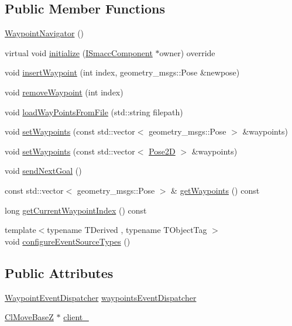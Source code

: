 \subsection*{Public Member Functions}
\begin{DoxyCompactItemize}
\item 
\hyperlink{classsmacc_1_1WaypointNavigator_a8924fe11db589727a91048ffdba2a85f}{Waypoint\+Navigator} ()
\item 
virtual void \hyperlink{classsmacc_1_1WaypointNavigator_a415aca03983319611e6872fb8c6e313f}{initialize} (\hyperlink{classsmacc_1_1ISmaccComponent}{I\+Smacc\+Component} $\ast$owner) override
\item 
void \hyperlink{classsmacc_1_1WaypointNavigator_abdcd86738247eccaf849903881247b0d}{insert\+Waypoint} (int index, geometry\+\_\+msgs\+::\+Pose \&newpose)
\item 
void \hyperlink{classsmacc_1_1WaypointNavigator_a4c290be90b5bfa44687f8beaa867f9b8}{remove\+Waypoint} (int index)
\item 
void \hyperlink{classsmacc_1_1WaypointNavigator_a3324ee12d697827e242b48ab3fd23edb}{load\+Way\+Points\+From\+File} (std\+::string filepath)
\item 
void \hyperlink{classsmacc_1_1WaypointNavigator_a2cb7fb208ade09ed7af4585837d051ee}{set\+Waypoints} (const std\+::vector$<$ geometry\+\_\+msgs\+::\+Pose $>$ \&waypoints)
\item 
void \hyperlink{classsmacc_1_1WaypointNavigator_a035fd5f71532fa87981a477fde5d363c}{set\+Waypoints} (const std\+::vector$<$ \hyperlink{structsmacc_1_1Pose2D}{Pose2D} $>$ \&waypoints)
\item 
void \hyperlink{classsmacc_1_1WaypointNavigator_a127438f90a00e98628ebd64b4c84b0b7}{send\+Next\+Goal} ()
\item 
const std\+::vector$<$ geometry\+\_\+msgs\+::\+Pose $>$ \& \hyperlink{classsmacc_1_1WaypointNavigator_afe1e18903d81f1d3eb20e2689f25b2ca}{get\+Waypoints} () const 
\item 
long \hyperlink{classsmacc_1_1WaypointNavigator_a6da63a864cb26b56922ca8c685e1a49c}{get\+Current\+Waypoint\+Index} () const 
\item 
{\footnotesize template$<$typename T\+Derived , typename T\+Object\+Tag $>$ }\\void \hyperlink{classsmacc_1_1WaypointNavigator_a7fc69e48021d638d86bcc8dff18f723a}{configure\+Event\+Source\+Types} ()
\end{DoxyCompactItemize}
\subsection*{Public Attributes}
\begin{DoxyCompactItemize}
\item 
\hyperlink{classsmacc_1_1WaypointEventDispatcher}{Waypoint\+Event\+Dispatcher} \hyperlink{classsmacc_1_1WaypointNavigator_aab7ff616b0eba7a5ad5f03113f2de8fd}{waypoints\+Event\+Dispatcher}
\item 
\hyperlink{classsmacc_1_1ClMoveBaseZ}{Cl\+Move\+BaseZ} $\ast$ \hyperlink{classsmacc_1_1WaypointNavigator_a2bdb0d4aea851d877fcb20e6d0897bb8}{client\+\_\+}
\end{DoxyCompactItemize}
